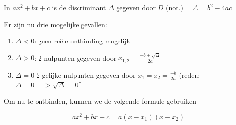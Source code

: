 In \(a x^2 + bx + c \) is de discriminant \( \Delta \) gegeven door \(D \textrm{ (not.)}= \Delta = b^2 - 4ac \)

Er zijn nu drie mogelijke gevallen:

\begin{enumerate}
	\item \(\Delta < 0 \): geen reële ontbinding mogelijk
	\item \(\Delta > 0 \): 2 nulpunten gegeven door \( x_{1,2} = \frac{-b \pm \sqrt{\Delta}}{2a} \)
	\item \(\Delta = 0\) 2 gelijke nulpunten gegeven door \( x_1 = x_2 = \frac{-b}{2a} \) (reden: \(\Delta = 0 => \sqrt{\Delta} = 0 \)[]
\end{enumerate}

Om nu te ontbinden, kunnen we de volgende formule gebruiken:

\[ ax^2 + bx + c = a(x - x_1)(x - x_2) \]
